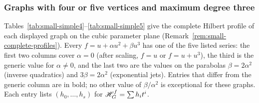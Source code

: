 \newcommand{\GKme}[1]{
  \begin{tikzpicture}[scale=#1*.75]
    \node[vertex] (v1) at (90:1.1) {};
    \node[vertex] (v2) at (90:0.3) {};
    \node[vertex] (v3) at (-45:1.3) {};
    \node[vertex] (v4) at (-135:1.3) {};
    \node[vertex] (v5) at (90:-.4) {};
    \draw (v1)--(v2)
    (v1)--(v3) (v1)--(v4) (v1)--(v5)
    (v2)--(v3) (v2)--(v4)
    (v3)--(v4) (v3)--(v5)
    (v4)--(v5);
  \end{tikzpicture}
}

\newcommand{\GKfi}[1]{
  \begin{tikzpicture}[scale=#1*0.8]
    \node[vertex] (v1) at (90:1.) {};
    \node[vertex] (v2) at (18:1.) {};
    \node[vertex] (v3) at (-54:1.) {};
    \node[vertex] (v4) at (-126:1.) {};
    \node[vertex] (v5) at (162:1.) {};
    \draw (v1)--(v2) (v1)--(v3) (v1)--(v4) (v1)--(v5)
    (v2)--(v3) (v2)--(v4) (v2)--(v5)
    (v3)--(v4) (v3)--(v5)
    (v4)--(v5);
  \end{tikzpicture}
}




\subsubsection{Graphs with four or five vertices and maximum degree three}

Tables~\ref{tab:small-simple4}--\ref{tab:small-simple5} give the
complete Hilbert profile of each displayed graph on the cubic parameter
plane (Remark~\ref{rem:small-complete-profiles}). Every
$f=u+\alpha u^2+\beta u^3$ has one of the five listed series: the first
two columns cover $\alpha=0$ (after scaling, $f=u$ or $f=u+u^3$), the
third is the generic value for $\alpha\ne0$, and the last two are the
values on the parabolas $\beta=2\alpha^2$ (inverse quadratics) and
$3\beta=2\alpha^2$ (exponential jets). Entries that differ from the
generic column are in bold; no other value of $\beta/\alpha^2$ is
exceptional for these graphs. Each entry lists $(h_0,\ldots,h_s)$ for
$\mathscr{H}_G^f=\sum h_it^i$.

